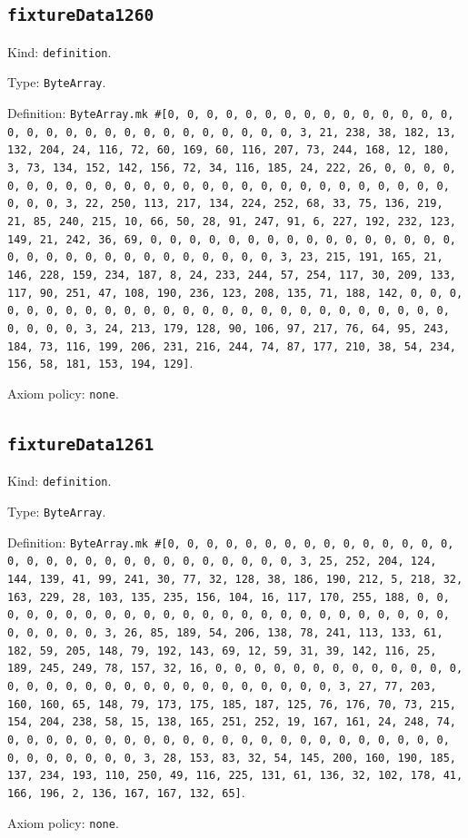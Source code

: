 \documentclass[11pt]{article}
\begin{document}
\subsection*{\texttt{fixtureData1260}}
\noindent Kind: \texttt{definition}.\par
\noindent Type: \texttt{ByteArray}.\par
\noindent Definition: \texttt{ByteArray.mk \#[0, 0, 0, 0, 0, 0, 0, 0, 0, 0, 0, 0, 0, 0, 0, 0, 0, 0, 0, 0, 0, 0, 0, 0, 0, 0, 0, 0, 0, 0, 3, 21, 238, 38, 182, 13, 132, 204, 24, 116, 72, 60, 169, 60, 116, 207, 73, 244, 168, 12, 180, 3, 73, 134, 152, 142, 156, 72, 34, 116, 185, 24, 222, 26, 0, 0, 0, 0, 0, 0, 0, 0, 0, 0, 0, 0, 0, 0, 0, 0, 0, 0, 0, 0, 0, 0, 0, 0, 0, 0, 0, 0, 0, 0, 3, 22, 250, 113, 217, 134, 224, 252, 68, 33, 75, 136, 219, 21, 85, 240, 215, 10, 66, 50, 28, 91, 247, 91, 6, 227, 192, 232, 123, 149, 21, 242, 36, 69, 0, 0, 0, 0, 0, 0, 0, 0, 0, 0, 0, 0, 0, 0, 0, 0, 0, 0, 0, 0, 0, 0, 0, 0, 0, 0, 0, 0, 0, 0, 3, 23, 215, 191, 165, 21, 146, 228, 159, 234, 187, 8, 24, 233, 244, 57, 254, 117, 30, 209, 133, 117, 90, 251, 47, 108, 190, 236, 123, 208, 135, 71, 188, 142, 0, 0, 0, 0, 0, 0, 0, 0, 0, 0, 0, 0, 0, 0, 0, 0, 0, 0, 0, 0, 0, 0, 0, 0, 0, 0, 0, 0, 0, 0, 3, 24, 213, 179, 128, 90, 106, 97, 217, 76, 64, 95, 243, 184, 73, 116, 199, 206, 231, 216, 244, 74, 87, 177, 210, 38, 54, 234, 156, 58, 181, 153, 194, 129]}.\par
\noindent Axiom policy: \texttt{none}.\par
\subsection*{\texttt{fixtureData1261}}
\noindent Kind: \texttt{definition}.\par
\noindent Type: \texttt{ByteArray}.\par
\noindent Definition: \texttt{ByteArray.mk \#[0, 0, 0, 0, 0, 0, 0, 0, 0, 0, 0, 0, 0, 0, 0, 0, 0, 0, 0, 0, 0, 0, 0, 0, 0, 0, 0, 0, 0, 0, 3, 25, 252, 204, 124, 144, 139, 41, 99, 241, 30, 77, 32, 128, 38, 186, 190, 212, 5, 218, 32, 163, 229, 28, 103, 135, 235, 156, 104, 16, 117, 170, 255, 188, 0, 0, 0, 0, 0, 0, 0, 0, 0, 0, 0, 0, 0, 0, 0, 0, 0, 0, 0, 0, 0, 0, 0, 0, 0, 0, 0, 0, 0, 0, 3, 26, 85, 189, 54, 206, 138, 78, 241, 113, 133, 61, 182, 59, 205, 148, 79, 192, 143, 69, 12, 59, 31, 39, 142, 116, 25, 189, 245, 249, 78, 157, 32, 16, 0, 0, 0, 0, 0, 0, 0, 0, 0, 0, 0, 0, 0, 0, 0, 0, 0, 0, 0, 0, 0, 0, 0, 0, 0, 0, 0, 0, 0, 0, 3, 27, 77, 203, 160, 160, 65, 148, 79, 173, 175, 185, 187, 125, 76, 176, 70, 73, 215, 154, 204, 238, 58, 15, 138, 165, 251, 252, 19, 167, 161, 24, 248, 74, 0, 0, 0, 0, 0, 0, 0, 0, 0, 0, 0, 0, 0, 0, 0, 0, 0, 0, 0, 0, 0, 0, 0, 0, 0, 0, 0, 0, 0, 0, 3, 28, 153, 83, 32, 54, 145, 200, 160, 190, 185, 137, 234, 193, 110, 250, 49, 116, 225, 131, 61, 136, 32, 102, 178, 41, 166, 196, 2, 136, 167, 167, 132, 65]}.\par
\noindent Axiom policy: \texttt{none}.\par
\end{document}
